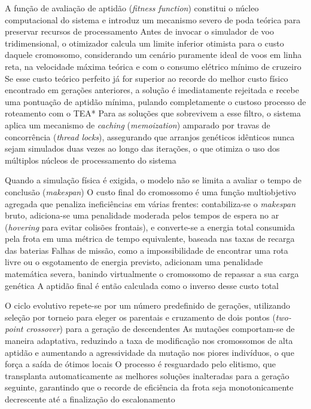 A função de avaliação de aptidão (\textit{fitness function}) constitui o núcleo computacional do sistema e introduz um mecanismo severo de poda teórica para preservar recursos de processamento %
Antes de invocar o simulador de voo tridimensional, o otimizador calcula um limite inferior otimista para o custo daquele cromossomo, considerando um cenário puramente ideal de voos em linha reta, na velocidade máxima teórica e com o consumo elétrico mínimo de cruzeiro %
Se esse custo teórico perfeito já for superior ao recorde do melhor custo físico encontrado em gerações anteriores, a solução é imediatamente rejeitada e recebe uma pontuação de aptidão mínima, pulando completamente o custoso processo de roteamento com o TEA* %
Para as soluções que sobrevivem a esse filtro, o sistema aplica um mecanismo de \textit{caching} (\textit{memoization}) amparado por travas de concorrência (\textit{thread locks}), assegurando que arranjos genéticos idênticos nunca sejam simulados duas vezes ao longo das iterações, o que otimiza o uso dos múltiplos núcleos de processamento do sistema %

Quando a simulação física é exigida, o modelo não se limita a avaliar o tempo de conclusão (\textit{makespan}) %
O custo final do cromossomo é uma função multiobjetivo agregada que penaliza ineficiências em várias frentes: contabiliza-se o \textit{makespan} bruto, adiciona-se uma penalidade moderada pelos tempos de espera no ar (\textit{hovering} para evitar colisões frontais), e converte-se a energia total consumida pela frota em uma métrica de tempo equivalente, baseada nas taxas de recarga das baterias %
Falhas de missão, como a impossibilidade de encontrar uma rota livre ou o esgotamento de energia previsto, adicionam uma penalidade matemática severa, banindo virtualmente o cromossomo de repassar a sua carga genética %
A aptidão final é então calculada como o inverso desse custo total %

O ciclo evolutivo repete-se por um número predefinido de gerações, utilizando seleção por torneio para eleger os parentais e cruzamento de dois pontos (\textit{two-point crossover}) para a geração de descendentes %
As mutações comportam-se de maneira adaptativa, reduzindo a taxa de modificação nos cromossomos de alta aptidão e aumentando a agressividade da mutação nos piores indivíduos, o que força a saída de ótimos locais %
O processo é resguardado pelo elitismo, que transplanta automaticamente as melhores soluções inalteradas para a geração seguinte, garantindo que o recorde de eficiência da frota seja monotonicamente decrescente até a finalização do escalonamento %

